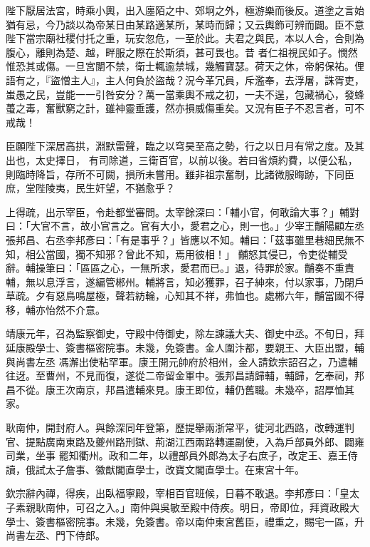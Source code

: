 \begin{pinyinscope}
 陛下厭居法宮，時乘小輿，出入廛陌之中、郊坰之外，極游樂而後反。道塗之言始猶有忌，今乃談以為帝某日由某路適某所，某時而歸；又云輿飾可辨而闢。臣不意陛下當宗廟社稷付托之重，玩安忽危，一至於此。夫君之與民，本以人合，合則為腹心，離則為楚、越，畔服之際在於斯須，甚可畏也。昔
 者仁祖視民如子。憫然惟恐其或傷。一旦宮闈不禁，衛士輒逾禁城，幾觸寶瑟。荷天之休，帝躬保祐。俚語有之，『盜憎主人』，主人何負於盜哉？況今革冗員，斥濫奉，去浮屠，誅胥吏，蚩愚之民，豈能一一引咎安分？萬一當乘輿不戒之初，一夫不逞，包藏禍心，發蜂蠆之毒，奮獸窮之計，雖神靈垂護，然亦損威傷重矣。又況有臣子不忍言者，可不戒哉！



 臣願陛下深居高拱，淵默雷聲，臨之以穹昊至高之勢，行之以日月有常之度。及其出也，太史擇日，
 有司除道，三衛百官，以前以後。若曰省煩約費，以便公私，則臨時降旨，存所不可闕，損所未嘗用。雖非祖宗奮制，比諸微服晦跡，下同臣庶，堂陛陵夷，民生奸望，不猶愈乎？



 上得疏，出示宰臣，令赴都堂審問。太宰餘深曰：「輔小官，何敢論大事？」輔對曰：「大官不言，故小官言之。官有大小，愛君之心，則一也。」少宰王黼陽顧左丞張邦昌、右丞李邦彥曰：「有是事乎？」皆應以不知。輔曰：「茲事雖里巷細民無不知，相公當國，獨不知邪？曾此不知，焉用彼相！」
 黼怒其侵已，令吏從輔受辭。輔操筆曰：「區區之心，一無所求，愛君而已。」退，待罪於家。黼奏不重責輔，無以息浮言，遂編管郴州。輔將言，知必獲罪，召子紳來，付以家事，乃閉戶草疏。夕有惡鳥鳴屋極，聲若紡輪，心知其不祥，弗恤也。處郴六年，黼當國不得移，輔亦怡然不介意。



 靖康元年，召為監察御史，守殿中侍御史，除左諫議大夫、御史中丞。不旬日，拜延康殿學士、簽書樞密院事。未幾，免簽書。金人圍汴都，要親王、大臣出盟，輔與尚書左丞
 馮澥出使粘罕軍。康王開元帥府於相州，金人請欽宗詔召之，乃遣輔往迓。至曹州，不見而復，遂從二帝留金軍中。張邦昌請歸輔，輔歸，乞奉祠，邦昌不從。康王次南京，邦昌遣輔來見。康王即位，輔仍舊職。未幾卒，詔厚恤其家。



 耿南仲，開封府人。與餘深同年登第，歷提舉兩浙常平，徙河北西路，改轉運判官、提點廣南東路及夔州路刑獄、荊湖江西兩路轉運副使，入為戶部員外郎、闢雍司業，坐事
 罷知衢州。政和二年，以禮部員外郎為太子右庶子，改定王、嘉王侍讀，俄試太子詹事、徽猷閣直學士，改寶文閣直學士。在東宮十年。



 欽宗辭內禪，得疾，出臥福寧殿，宰相百官班候，日暮不敢退。李邦彥曰：「皇太子素親耿南仲，可召之入。」南仲與吳敏至殿中侍疾。明日，帝即位，拜資政殿大學士、簽書樞密院事。未幾，免簽書。帝以南仲東宮舊臣，禮重之，賜宅一區，升尚書左丞、門下侍郎。




\end{pinyinscope}
